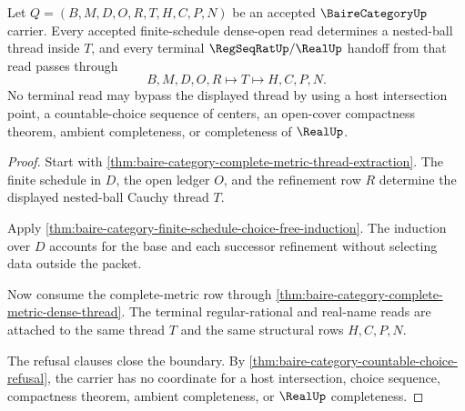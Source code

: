 \begin{theorem}
\label{thm:baire-category-nested-ball-thread-totality}
Let $Q=(B,M,D,O,R,T,H,C,P,N)$ be an accepted $\BaireCategoryUp$ carrier. Every accepted finite-schedule dense-open read determines a nested-ball thread inside $T$, and every terminal $\RegSeqRatUp/\RealUp$ handoff from that read passes through
$$
B,M,D,O,R \longmapsto T \longmapsto H,C,P,N .
$$
No terminal read may bypass the displayed thread by using a host intersection point, a countable-choice sequence of centers, an open-cover compactness theorem, ambient completeness, or completeness of $\RealUp$.
\end{theorem}
\begin{proof}
Start with \autoref{thm:baire-category-complete-metric-thread-extraction}. The finite schedule in $D$, the open ledger $O$, and the refinement row $R$ determine the displayed nested-ball Cauchy thread $T$.

Apply \autoref{thm:baire-category-finite-schedule-choice-free-induction}. The induction over $D$ accounts for the base and each successor refinement without selecting data outside the packet.

Now consume the complete-metric row through \autoref{thm:baire-category-complete-metric-dense-thread}. The terminal regular-rational and real-name reads are attached to the same thread $T$ and the same structural rows $H,C,P,N$.

The refusal clauses close the boundary. By \autoref{thm:baire-category-countable-choice-refusal}, the carrier has no coordinate for a host intersection, choice sequence, compactness theorem, ambient completeness, or $\RealUp$ completeness.
\end{proof}

